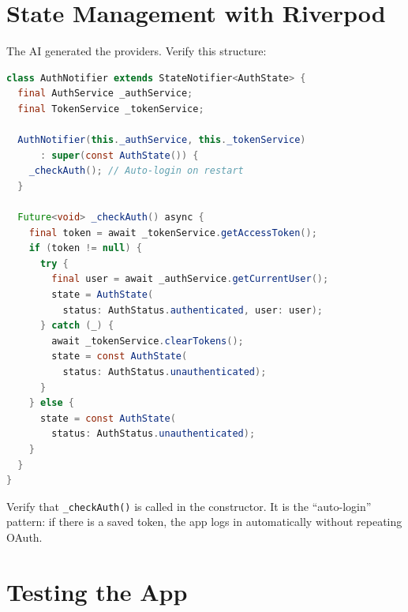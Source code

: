 \section{State Management with Riverpod}

The AI generated the providers. Verify this structure:

\begin{lstlisting}[language=Java,title={Riverpod AuthNotifier pattern}]
class AuthNotifier extends StateNotifier<AuthState> {
  final AuthService _authService;
  final TokenService _tokenService;

  AuthNotifier(this._authService, this._tokenService)
      : super(const AuthState()) {
    _checkAuth(); // Auto-login on restart
  }

  Future<void> _checkAuth() async {
    final token = await _tokenService.getAccessToken();
    if (token != null) {
      try {
        final user = await _authService.getCurrentUser();
        state = AuthState(
          status: AuthStatus.authenticated, user: user);
      } catch (_) {
        await _tokenService.clearTokens();
        state = const AuthState(
          status: AuthStatus.unauthenticated);
      }
    } else {
      state = const AuthState(
        status: AuthStatus.unauthenticated);
    }
  }
}
\end{lstlisting}

\begin{tipbox}
Verify that \texttt{\_checkAuth()} is called in the constructor. It is the ``auto-login'' pattern: if there is a saved token, the app logs in automatically without repeating OAuth.
\end{tipbox}

\section{Testing the App}


